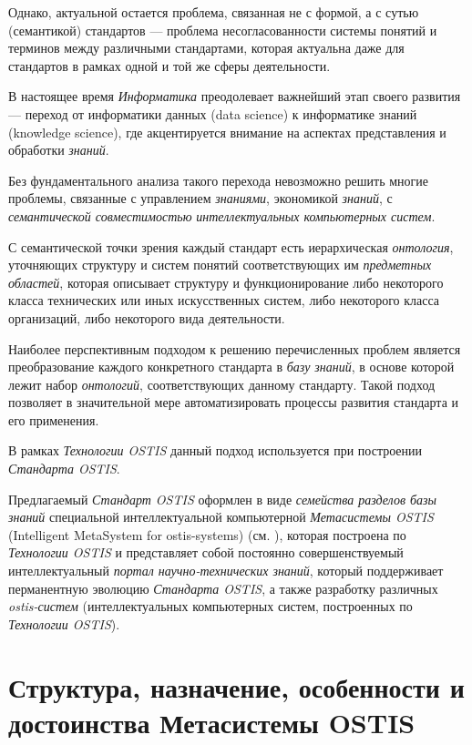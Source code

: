 Однако, актуальной остается проблема, связанная не с формой, а с сутью (семантикой) стандартов --- проблема несогласованности системы понятий и терминов между различными стандартами, которая актуальна даже для стандартов в рамках одной и той же сферы деятельности.

В настоящее время \textit{Информатика} преодолевает важнейший этап своего развития --- переход от информатики данных (data science) к информатике знаний (knowledge science), где акцентируется внимание на  аспектах представления и обработки \textit{знаний}.

Без фундаментального анализа такого перехода невозможно решить многие проблемы, связанные с управлением \textit{знаниями}, экономикой \textit{знаний}, с \textit{семантической совместимостью} \textit{интеллектуальных компьютерных систем}.

С семантической точки зрения каждый стандарт есть иерархическая \textit{онтология}, уточняющих структуру и систем понятий соответствующих им \textit{предметных областей}, которая описывает структуру и функционирование либо некоторого класса технических или иных искусственных систем, либо некоторого класса организаций, либо некоторого вида деятельности. 

Наиболее перспективным подходом к решению перечисленных проблем является преобразование каждого конкретного стандарта в \textit{базу знаний}, в основе которой лежит набор \textit{онтологий}, соответствующих данному стандарту. Такой подход позволяет в значительной мере автоматизировать процессы развития стандарта и его применения.

В рамках \textit{Технологии OSTIS} данный подход используется при построении \textit{Стандарта OSTIS}.
 
Предлагаемый \textit{Стандарт OSTIS} оформлен в виде \textit{семейства разделов базы знаний} специальной интеллектуальной компьютерной \textit{Метасистемы OSTIS} (Intelligent MetaSystem for ostis-systems) (см. ), которая построена по \textit{Технологии OSTIS} и представляет собой постоянно совершенствуемый интеллектуальный \textit{портал научно-технических знаний}, который поддерживает перманентную эволюцию \textit{Стандарта OSTIS}, а также разработку различных \textit{ostis-систем} (интеллектуальных компьютерных систем, построенных по \textit{Технологии OSTIS}).


\section{Структура, назначение, особенности и достоинства Метасистемы OSTIS}
\label{sec_metasystem}

